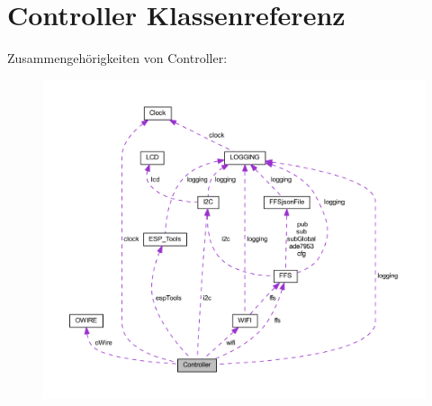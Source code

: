 \hypertarget{class_controller}{}\section{Controller Klassenreferenz}
\label{class_controller}


Zusammengehörigkeiten von Controller\+:\nopagebreak
\begin{figure}[H]
\begin{center}
\leavevmode
\includegraphics[width=350pt]{class_controller__coll__graph}
\end{center}
\end{figure}
